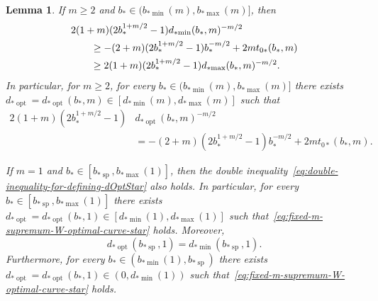 \documentclass[a4paper]{amsart} %
\newtheorem{lemma}[theorem]{Lemma}
\theoremstyle{definition}
\theoremstyle{remark}
\numberwithin{equation}{section}
\newcommand*{\bStar}{b_*}
\newcommand*{\tZeroStar}{t_{0*}}
\newcommand*{\bMinStar}{b_{*\!\min}}
\newcommand*{\bMaxStar}{b_{*\!\max}}
\newcommand*{\dMinStar}{d_{*\!\min}}
\newcommand*{\dMaxStar}{d_{*\!\max}}
\newcommand*{\dOptStar}{d_{*\!\operatorname{opt}}}
\newcommand*{\bShStar}{b_{*\!\operatorname{sp}}}
\begin{document}
\begin{lemma}
	\label{lem:dOpt-definition-star}
	If $m\geq 2$ and $\bStar\in (\bMinStar(m), \bMaxStar(m)]$,
	then
	\begin{align}
	\label{eq:double-inequality-for-defining-dOptStar}
	\MoveEqLeft[2]
	2(1+m)(2\bStar^{1+m/2} -1) \dMinStar(\bStar,m)^{-m/2} \\
	&\geq -(2+m)(2\bStar^{1+m/2} - 1) \bStar^{-m/2}  
	+ 2m \tZeroStar(\bStar,m)\nonumber\\
	&\geq 2(1+m)(2\bStar^{1+m/2} -1) \dMaxStar(\bStar,m)^{-m/2}.\nonumber
	\end{align}	
	In particular, for $m\geq 2$,  
	for every $\bStar\in (\bMinStar(m), \bMaxStar(m)]$ 
	there exists  
	$\dOptStar = \dOptStar(\bStar,m)\in [\dMinStar(m),\dMaxStar(m)]$ 
	such that
	\begin{align}
	\label{eq:fixed-m-supremum-W-optimal-curve-star}
	2(1+m)(2 \bStar^{1+m/2} -1)&\dOptStar(\bStar, m)^{-m/2}\\
	&=-(2+m)(2\bStar^{1+m/2} -1)\bStar^{-m/2} %
	+2m \tZeroStar(\bStar,m).\nonumber
	\end{align}
	
	If $m=1$ and $\bStar \in [\bShStar, \bMaxStar(1)]$, then the double inequality~\eqref{eq:double-inequality-for-defining-dOptStar} also holds.
	In particular, for every $\bStar\in [\bShStar, \bMaxStar(1)]$ 
	there exists $\dOptStar = \dOptStar(\bStar,1)\in [\dMinStar(1),\dMaxStar(1)]$ 
	such that~\eqref{eq:fixed-m-supremum-W-optimal-curve-star} holds.
	Moreover,
	\[
	\dOptStar(\bShStar,1) = \dMinStar(\bShStar, 1).
	\]
	Furthermore, for every $\bStar\in (\bMinStar(1),\bShStar)$
	there exists $\dOptStar = \dOptStar(\bStar,1)\in (0,\dMinStar(1))$ 
	such that~\eqref{eq:fixed-m-supremum-W-optimal-curve-star} holds.
\end{lemma}
\end{document}
